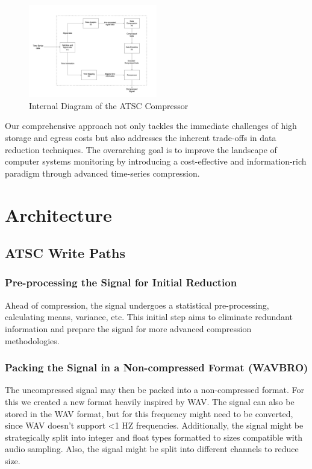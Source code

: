 \documentclass[conference]{IEEEtran}
\begin{document}
  
\begin{figure}[h]
  \centering
  \includegraphics[width=0.5\textwidth]{Fig2.png}
  \caption{Internal Diagram of the ATSC Compressor}
  \label{internal}
\end{figure}

Our comprehensive approach not only tackles the immediate challenges of high storage and egress costs but also addresses the inherent trade-offs in data reduction techniques. The overarching goal is to improve the landscape of computer systems monitoring by introducing a cost-effective and information-rich paradigm through advanced time-series compression. 



\section{Architecture}

\subsection{ATSC Write Paths}

\subsubsection{Pre-processing the Signal for Initial Reduction}
Ahead of compression, the signal undergoes a statistical pre-processing, calculating means, variance, etc. This initial step aims to eliminate redundant information and prepare the signal for more advanced compression methodologies.

\vspace{10pt}
\subsubsection{Packing the Signal in a Non-compressed Format (WAVBRO)}
The uncompressed signal may then be packed into a non-compressed format. For this we created a new format heavily inspired by WAV. The signal can also be stored in the WAV format, but for this frequency might need to be converted, since WAV doesn't support <1 HZ frequencies. Additionally, the signal might be strategically split into integer and float types formatted to sizes compatible with audio sampling. Also, the signal might be split into different channels to reduce size. 
\end{document}
